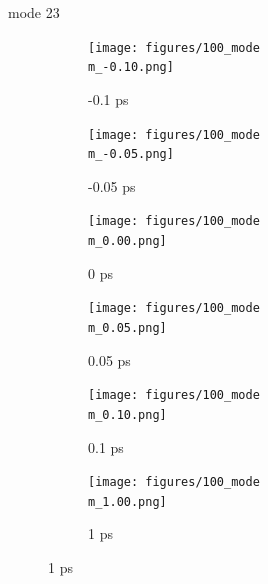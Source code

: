 \documentclass{beamer}
\newcommand\w{0.32}
\begin{document}
\renewcommand\m{23}
\begin{frame}{mode \m}
	\begin{figure}
		\centering
		\begin{subfigure}[b]{\w\textwidth}
			\centering
			\texttt{[image: figures/100\_mode\\m\_-0.10.png]}
			\caption{-0.1 ps}
		\end{subfigure}
		\begin{subfigure}[b]{\w\textwidth}
			\centering
			\texttt{[image: figures/100\_mode\\m\_-0.05.png]}
			\caption{-0.05 ps}
		\end{subfigure}
		\begin{subfigure}[b]{\w\textwidth}
			\centering
			\texttt{[image: figures/100\_mode\\m\_0.00.png]}
			\caption{0 ps}
		\end{subfigure}
		\begin{subfigure}[b]{\w\textwidth}
			\centering
			\texttt{[image: figures/100\_mode\\m\_0.05.png]}
			\caption{0.05 ps}
		\end{subfigure}
		\begin{subfigure}[b]{\w\textwidth}
			\centering
			\texttt{[image: figures/100\_mode\\m\_0.10.png]}
			\caption{0.1 ps}
		\end{subfigure}
		\begin{subfigure}[b]{\w\textwidth}
			\centering
			\texttt{[image: figures/100\_mode\\m\_1.00.png]}
			\caption{1 ps}
		\end{subfigure}
	\end{figure}
\end{frame}
\end{document}
